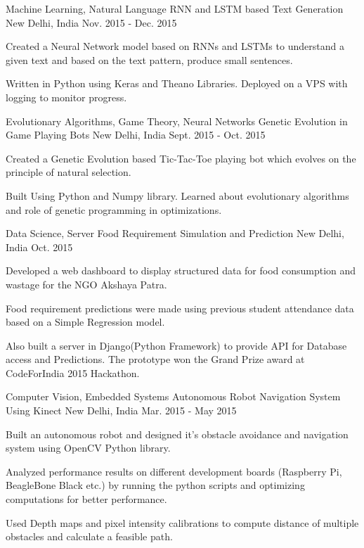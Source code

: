 \begin{cventries}
  \cventry
    {Machine Learning, Natural Language}
    {RNN and LSTM based Text Generation}
    {New Delhi, India}
    {Nov. 2015 - Dec. 2015}
    {
      \begin{cvitems}
        \item {Created a Neural Network model based on RNNs and LSTMs to understand a given text and based on the text pattern, produce small sentences.}
        \item {Written in Python using Keras and Theano Libraries. Deployed on a VPS with logging to monitor progress.}
      \end{cvitems}
    }
  \cventry
    {Evolutionary Algorithms, Game Theory, Neural Networks}
    {Genetic Evolution in Game Playing Bots}
    {New Delhi, India}
    {Sept. 2015 - Oct. 2015}
    {
      \begin{cvitems}
        \item {Created a Genetic Evolution based Tic-Tac-Toe playing bot which evolves on the principle of natural selection.}
        \item {Built Using Python and Numpy library. Learned about evolutionary algorithms and role of genetic programming in optimizations.}
      \end{cvitems}
    }
  \cventry
    {Data Science, Server}
    {Food Requirement Simulation and Prediction}
    {New Delhi, India}
    {Oct. 2015}
    {
      \begin{cvitems}
        \item {Developed a web dashboard to display structured data for food consumption and wastage for the NGO Akshaya Patra.}
        \item {Food requirement predictions were made using previous student attendance data based on a Simple Regression model.}
        \item {Also built a server in Django(Python Framework) to provide API for Database access and Predictions. The prototype won the Grand Prize award at CodeForIndia 2015 Hackathon.}
      \end{cvitems} 
    }
  \cventry
    {Computer Vision, Embedded Systems}
    {Autonomous Robot Navigation System Using Kinect}
    {New Delhi, India}
    {Mar. 2015 - May 2015}
    {
      \begin{cvitems}
        \item {Built an autonomous robot and designed it's obstacle avoidance and navigation system using OpenCV Python library.}
        \item {Analyzed performance results on different development boards (Raspberry Pi, BeagleBone Black etc.) by running the python scripts and optimizing computations for better performance.}
        \item {Used Depth maps and pixel intensity calibrations to compute distance of multiple obstacles and calculate a feasible path.}
      \end{cvitems} 
    }
\end{cventries}
